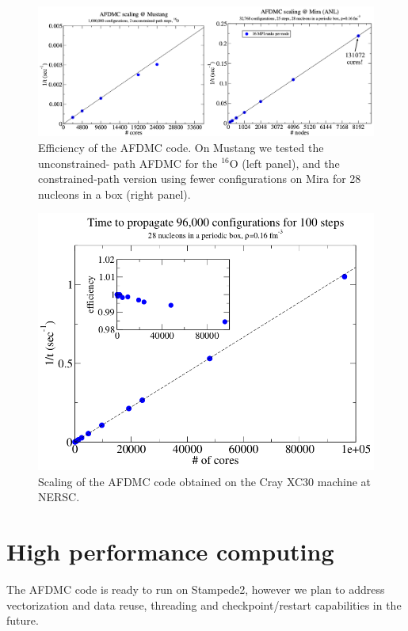 \documentclass[12pt,letterpaper]{article}
\begin{document}
\begin{figure}[!htb]
\centering
\includegraphics[width=\linewidth]{mustang.png}
\caption{Efficiency of the AFDMC code. On Mustang we tested the unconstrained-
path AFDMC
for the $^{16}$O (left panel), and the constrained-path version using fewer 
configurations on Mira for 28
nucleons in a box (right panel).}
\label{fig:mustang}
\end{figure}	

\begin{figure}[!htb]
\centering
\includegraphics[width=0.5\linewidth]{cray.png}
\caption{Scaling of the AFDMC code obtained on the Cray XC30 machine at NERSC.}
\label{fig:cray}
\end{figure}	

\newpage
\section{High performance computing}

The AFDMC code is ready to run on Stampede2, however we plan to address 
vectorization and data reuse, threading and checkpoint/restart capabilities in 
the future.
\end{document}
